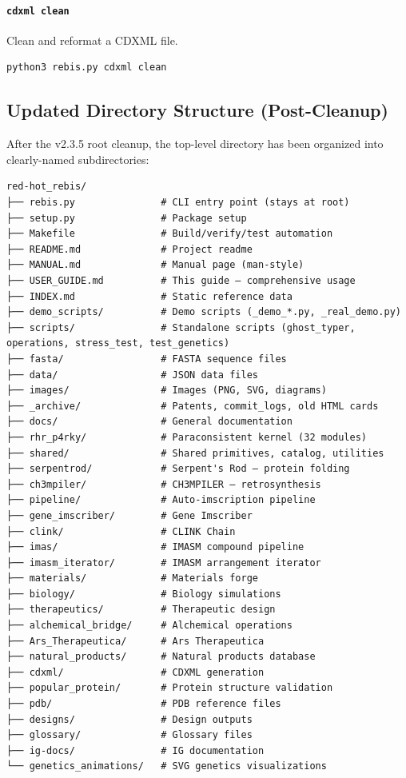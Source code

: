 \documentclass[12pt,a4paper]{article}
\begin{document}
\hypertarget{cdxml-clean}{%
\paragraph{\texorpdfstring{\texttt{cdxml\ clean}}{cdxml clean}}\label{cdxml-clean}}

Clean and reformat a CDXML file.

\begin{verbatim}
python3 rebis.py cdxml clean
\end{verbatim}

\hypertarget{updated-directory-structure-post-cleanup}{%
\subsection{Updated Directory Structure
(Post-Cleanup)}\label{updated-directory-structure-post-cleanup}}

After the v2.3.5 root cleanup, the top-level directory has been
organized into clearly-named subdirectories:

\begin{verbatim}
red-hot_rebis/
├── rebis.py               # CLI entry point (stays at root)
├── setup.py               # Package setup
├── Makefile               # Build/verify/test automation
├── README.md              # Project readme
├── MANUAL.md              # Manual page (man-style)
├── USER_GUIDE.md          # This guide — comprehensive usage
├── INDEX.md               # Static reference data
├── demo_scripts/          # Demo scripts (_demo_*.py, _real_demo.py)
├── scripts/               # Standalone scripts (ghost_typer, operations, stress_test, test_genetics)
├── fasta/                 # FASTA sequence files
├── data/                  # JSON data files
├── images/                # Images (PNG, SVG, diagrams)
├── _archive/              # Patents, commit_logs, old HTML cards
├── docs/                  # General documentation
├── rhr_p4rky/             # Paraconsistent kernel (32 modules)
├── shared/                # Shared primitives, catalog, utilities
├── serpentrod/            # Serpent's Rod — protein folding
├── ch3mpiler/             # CH3MPILER — retrosynthesis
├── pipeline/              # Auto-imscription pipeline
├── gene_imscriber/        # Gene Imscriber
├── clink/                 # CLINK Chain
├── imas/                  # IMASM compound pipeline
├── imasm_iterator/        # IMASM arrangement iterator
├── materials/             # Materials forge
├── biology/               # Biology simulations
├── therapeutics/          # Therapeutic design
├── alchemical_bridge/     # Alchemical operations
├── Ars_Therapeutica/      # Ars Therapeutica
├── natural_products/      # Natural products database
├── cdxml/                 # CDXML generation
├── popular_protein/       # Protein structure validation
├── pdb/                   # PDB reference files
├── designs/               # Design outputs
├── glossary/              # Glossary files
├── ig-docs/               # IG documentation
└── genetics_animations/   # SVG genetics visualizations
\end{verbatim}
\end{document}
